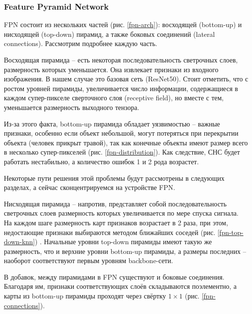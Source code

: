 \subsubsection{Feature Pyramid Network} \label{sect-5-2}

FPN состоит из нескольких частей (рис. \ref{fpn-arch}): восходящей (bottom-up) и нисходящей (top-down) пирамид, а также боковых соединений (lateral connections). Рассмотрим подробнее каждую часть.


Восходящая пирамида -- есть некоторая последовательность светрочных слоев, размерность которых уменьшается. Она  извлекает признаки из входного изображения. В нашем случае это базовая сеть (ResNet50). Стоит отметить, что с ростом уровней пирамиды, увеличивается число информации, содержащиеся в каждом супер-пикселе сверточного слоя (receptive field), но вместе с тем, уменьшается размерность выходного тензора.

Из-за этого факта, bottom-up пирамида обладает уязвимостью -- важные признаки, особенно если объект небольшой, могут потеряться при перекрытии объекта (человек прикрыт травой), так как конечные объекты имеют размер всего в несколько супер-пикселей (рис. \ref{fpn-distribution}). Как следствие, СНС будет работать нестабильно, а количество ошибок 1 и 2 рода возрастет. 


Некоторые пути решения этой проблемы будут рассмотрены в следующих разделах, а сейчас сконцентрируемся на устройстве FPN.

Нисходящая пирамида -- напротив, представляет собой последовательность светрочных слоев размерность которых увеличивается по мере спуска сигнала. На каждом шаге размерность карт признаков возрастает в 2 раза, при этом, недостающие признаки выбираются методом ближайших соседей (рис. \ref{fpn-top-down-knn}) \cite{lib-knn}. Начальные уровни top-down пирамиды имеют такую же размерность, что и верхние уровни bottom-up пирамиды, а размеры последних -- наоборот соответствуют первым уровням backbone-сети.


В добавок, между пирамидами в FPN существуют и боковые соединения. Благодаря им, признаки соответствующих слоёв складываются поэлементно, а карты из bottom-up пирамиды проходят через свёртку $1 \times 1$ (рис. \ref{fpn-connections}).

